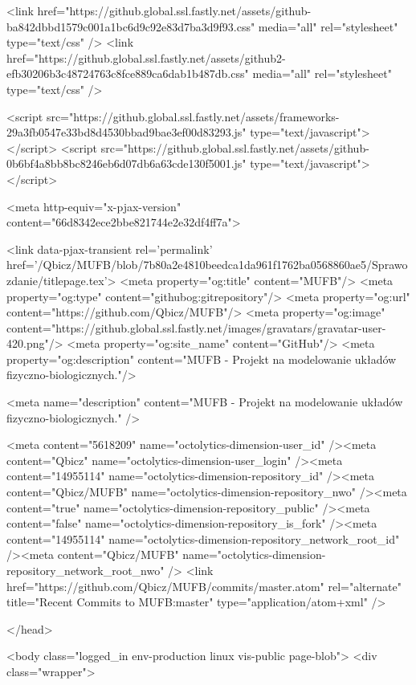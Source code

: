     <link href="https://github.global.ssl.fastly.net/assets/github-ba842dbbd1579c001a1bc6d9c92e83d7ba3d9f93.css" media="all" rel="stylesheet" type="text/css" />
    <link href="https://github.global.ssl.fastly.net/assets/github2-efb30206b3c48724763c8fce889ca6dab1b487db.css" media="all" rel="stylesheet" type="text/css" />
    

    

      <script src="https://github.global.ssl.fastly.net/assets/frameworks-29a3fb0547e33bd8d4530bbad9bae3ef00d83293.js" type="text/javascript"></script>
      <script src="https://github.global.ssl.fastly.net/assets/github-0b6bf4a8bb8bc8246eb6d07db6a63cde130f5001.js" type="text/javascript"></script>
      
      <meta http-equiv="x-pjax-version" content="66d8342ece2bbe821744e2e32df4ff7a">

        <link data-pjax-transient rel='permalink' href='/Qbicz/MUFB/blob/7b80a2e4810beedca1da961f1762ba0568860ae5/Sprawozdanie/titlepage.tex'>
  <meta property="og:title" content="MUFB"/>
  <meta property="og:type" content="githubog:gitrepository"/>
  <meta property="og:url" content="https://github.com/Qbicz/MUFB"/>
  <meta property="og:image" content="https://github.global.ssl.fastly.net/images/gravatars/gravatar-user-420.png"/>
  <meta property="og:site_name" content="GitHub"/>
  <meta property="og:description" content="MUFB - Projekt na modelowanie układów fizyczno-biologicznych."/>

  <meta name="description" content="MUFB - Projekt na modelowanie układów fizyczno-biologicznych." />

  <meta content="5618209" name="octolytics-dimension-user_id" /><meta content="Qbicz" name="octolytics-dimension-user_login" /><meta content="14955114" name="octolytics-dimension-repository_id" /><meta content="Qbicz/MUFB" name="octolytics-dimension-repository_nwo" /><meta content="true" name="octolytics-dimension-repository_public" /><meta content="false" name="octolytics-dimension-repository_is_fork" /><meta content="14955114" name="octolytics-dimension-repository_network_root_id" /><meta content="Qbicz/MUFB" name="octolytics-dimension-repository_network_root_nwo" />
  <link href="https://github.com/Qbicz/MUFB/commits/master.atom" rel="alternate" title="Recent Commits to MUFB:master" type="application/atom+xml" />

  </head>


  <body class="logged_in  env-production linux vis-public page-blob">
    <div class="wrapper">
      
